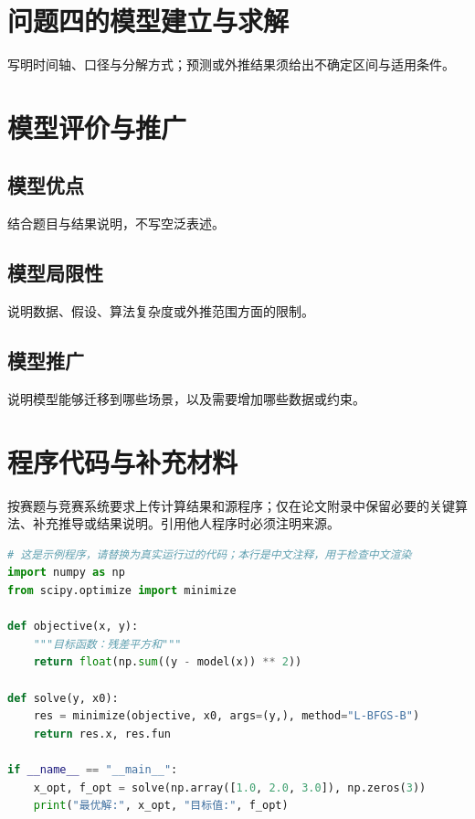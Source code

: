 \documentclass{huawei-cup}
\begin{document}
\section{问题四的模型建立与求解}
写明时间轴、口径与分解方式；预测或外推结果须给出不确定区间与适用条件。

\section{模型评价与推广}
\subsection{模型优点}
结合题目与结果说明，不写空泛表述。

\subsection{模型局限性}
说明数据、假设、算法复杂度或外推范围方面的限制。

\subsection{模型推广}
说明模型能够迁移到哪些场景，以及需要增加哪些数据或约束。




\appendix
{}
\section{程序代码与补充材料}
按赛题与竞赛系统要求上传计算结果和源程序；仅在论文附录中保留必要的关键算法、补充推导或结果说明。引用他人程序时必须注明来源。

\begin{lstlisting}[language=Python,caption={关键求解代码（节选，示例）},label={lst:code-demo}]
# 这是示例程序，请替换为真实运行过的代码；本行是中文注释，用于检查中文渲染
import numpy as np
from scipy.optimize import minimize

def objective(x, y):
    """目标函数：残差平方和"""
    return float(np.sum((y - model(x)) ** 2))

def solve(y, x0):
    res = minimize(objective, x0, args=(y,), method="L-BFGS-B")
    return res.x, res.fun

if __name__ == "__main__":
    x_opt, f_opt = solve(np.array([1.0, 2.0, 3.0]), np.zeros(3))
    print("最优解:", x_opt, "目标值:", f_opt)
\end{lstlisting}
\end{document}
